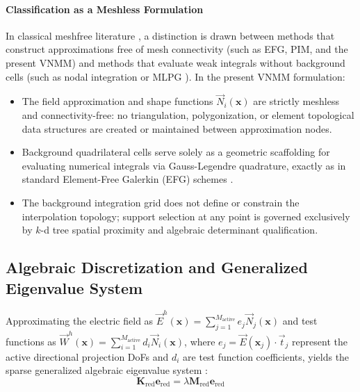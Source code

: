 \documentclass[preprint,12pt]{elsarticle}
\begin{document}
\paragraph{Classification as a Meshless Formulation}
In classical meshfree literature \cite{belytschko1994element, atluri2002meshless, liu2009mesh}, a distinction is drawn between methods that construct approximations free of mesh connectivity (such as EFG, PIM, and the present VNMM) and methods that evaluate weak integrals without background cells (such as nodal integration \cite{chen2001stabilized} or MLPG \cite{atluri2002meshless}). In the present VNMM formulation:
\begin{itemize}
    \item The field approximation and shape functions $\vec{N}_i(\mathbf{x})$ are strictly meshless and connectivity-free: no triangulation, polygonization, or element topological data structures are created or maintained between approximation nodes.
    \item Background quadrilateral cells serve solely as a geometric scaffolding for evaluating numerical integrals via Gauss-Legendre quadrature, exactly as in standard Element-Free Galerkin (EFG) schemes \cite{belytschko1994element, parreira2006efficient}.
    \item The background integration grid does not define or constrain the interpolation topology; support selection at any point is governed exclusively by $k$-d tree spatial proximity and algebraic determinant qualification.
\end{itemize}

\subsection{Algebraic Discretization and Generalized Eigenvalue System}
\label{subsec:algebraic_system}

Approximating the electric field as $\vec{E}^h(\mathbf{x}) = \sum_{j=1}^{M_{\mathrm{active}}} e_j \vec{N}_j(\mathbf{x})$ and test functions as $\vec{W}^h(\mathbf{x}) = \sum_{i=1}^{M_{\mathrm{active}}} d_i \vec{N}_i(\mathbf{x})$, where $e_j = \vec{E}(\mathbf{x}_j) \cdot \vec{t}_j$ represent the active directional projection DoFs and $d_i$ are test function coefficients, yields the sparse generalized algebraic eigenvalue system \cite{ortiz2023tese, goncalves2025tese}:
\begin{equation}
\mathbf{K}_{\mathrm{red}} \mathbf{e}_{\mathrm{red}} = \lambda \mathbf{M}_{\mathrm{red}} \mathbf{e}_{\mathrm{red}}
\label{eq:generalized_eigenvalue_system}
\end{equation}
\end{document}
